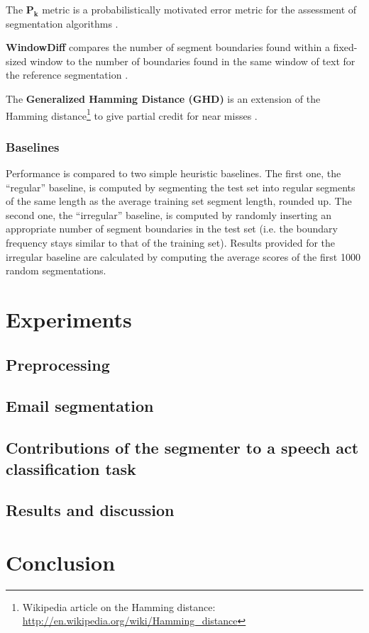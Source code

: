 \documentclass[11pt]{article}
\begin{document}
The $\bm{P_{k}}$ metric is a probabilistically motivated error metric for the assessment of segmentation algorithms \cite{beeferman1999statistical}.

\textbf{WindowDiff} compares the number of segment boundaries found within a fixed-sized window to the number of boundaries found in the same window of text for the reference segmentation \cite{pevzner2002critique}.

The \textbf{Generalized Hamming Distance (GHD)} is an extension of the Hamming distance\footnote{Wikipedia article on the Hamming distance: \url{http://en.wikipedia.org/wiki/Hamming_distance}} to give partial credit for near misses \cite{bookstein2002generalized}.

\subsubsection{Baselines}

Performance is compared to two simple heuristic baselines. The first one, the ``regular'' baseline, is computed by segmenting the test set into regular segments of the same length as the average training set segment length, rounded up. The second one, the ``irregular'' baseline, is computed by randomly inserting an appropriate number of segment boundaries in the test set (i.e. the boundary frequency stays similar to that of the training set). Results provided for the irregular baseline are calculated by computing the average scores of the first 1000 random segmentations.

\section{Experiments}

\subsection{Preprocessing}



\subsection{Email segmentation}

\subsection{Contributions of the segmenter to a speech act classification task}

\subsection{Results and discussion}

\section{Conclusion}



\end{document}
